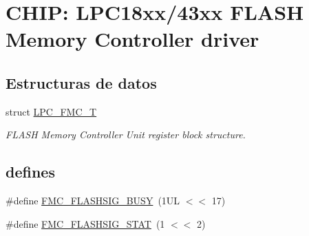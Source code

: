 \hypertarget{group___f_m_c__18_x_x__43_x_x}{}\section{C\+H\+IP\+: L\+P\+C18xx/43xx F\+L\+A\+SH Memory Controller driver}
\label{group___f_m_c__18_x_x__43_x_x}
\subsection*{Estructuras de datos}
\begin{DoxyCompactItemize}
\item 
struct \hyperlink{struct_l_p_c___f_m_c___t}{L\+P\+C\+\_\+\+F\+M\+C\+\_\+T}
\begin{DoxyCompactList}\small\item\em F\+L\+A\+SH Memory Controller Unit register block structure. \end{DoxyCompactList}\end{DoxyCompactItemize}
\subsection*{\textquotesingle{}defines\textquotesingle{}}
\begin{DoxyCompactItemize}
\item 
\#define \hyperlink{group___f_m_c__18_x_x__43_x_x_ga1c732efb3127d9e699c46b4a89706639}{F\+M\+C\+\_\+\+F\+L\+A\+S\+H\+S\+I\+G\+\_\+\+B\+U\+SY}~(1\+U\+L $<$$<$ 17)
\item 
\#define \hyperlink{group___f_m_c__18_x_x__43_x_x_ga3d2c7a30422c68c08d48b4e4f03a2787}{F\+M\+C\+\_\+\+F\+L\+A\+S\+H\+S\+I\+G\+\_\+\+S\+T\+AT}~(1 $<$$<$ 2)
\end{DoxyCompactItemize}
